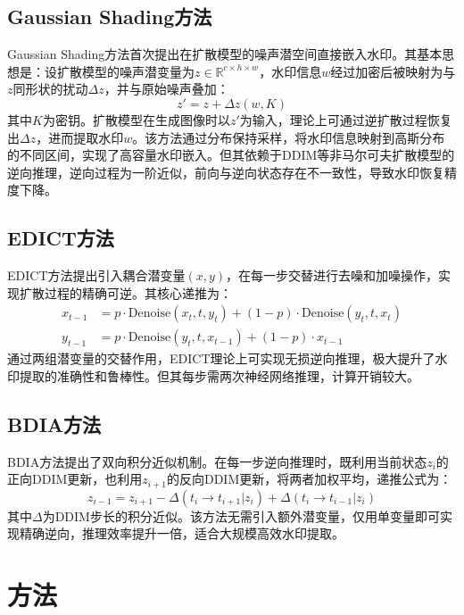 \documentclass[conference]{IEEEtran}
\begin{document}
\subsection{Gaussian Shading方法}
Gaussian Shading方法\cite{Yang_2024_CVPR}首次提出在扩散模型的噪声潜空间直接嵌入水印。其基本思想是：设扩散模型的噪声潜变量为$z \in \mathbb{R}^{c \times h \times w}$，水印信息$w$经过加密后被映射为与$z$同形状的扰动$\Delta z$，并与原始噪声叠加：
\begin{equation}
    z' = z + \Delta z(w, K)
\end{equation}
其中$K$为密钥。扩散模型在生成图像时以$z'$为输入，理论上可通过逆扩散过程恢复出$\Delta z$，进而提取水印$w$。该方法通过分布保持采样，将水印信息映射到高斯分布的不同区间，实现了高容量水印嵌入。但其依赖于DDIM等非马尔可夫扩散模型的逆向推理，逆向过程为一阶近似，前向与逆向状态存在不一致性，导致水印恢复精度下降。

\subsection{EDICT方法}
EDICT方法\cite{panthi2025watermarkingdiffusionmodelgaussian}提出引入耦合潜变量$(x, y)$，在每一步交替进行去噪和加噪操作，实现扩散过程的精确可逆。其核心递推为：
\begin{align}
    x_{t-1} &= p \cdot \text{Denoise}(x_t, t, y_t) + (1-p) \cdot \text{Denoise}(y_t, t, x_t) \\
    y_{t-1} &= p \cdot \text{Denoise}(y_t, t, x_{t-1}) + (1-p) \cdot x_{t-1}
\end{align}
通过两组潜变量的交替作用，EDICT理论上可实现无损逆向推理，极大提升了水印提取的准确性和鲁棒性。但其每步需两次神经网络推理，计算开销较大。

\subsection{BDIA方法}
BDIA方法\cite{zhang2024exact}提出了双向积分近似机制。在每一步逆向推理时，既利用当前状态$z_i$的正向DDIM更新，也利用$z_{i+1}$的反向DDIM更新，将两者加权平均，递推公式为：
\begin{equation}
    z_{i-1} = z_{i+1} - \Delta(t_i \to t_{i+1}|z_i) + \Delta(t_i \to t_{i-1}|z_i)
\end{equation}
其中$\Delta$为DDIM步长的积分近似。该方法无需引入额外潜变量，仅用单变量即可实现精确逆向，推理效率提升一倍，适合大规模高效水印提取。

\section{方法}
\end{document}
